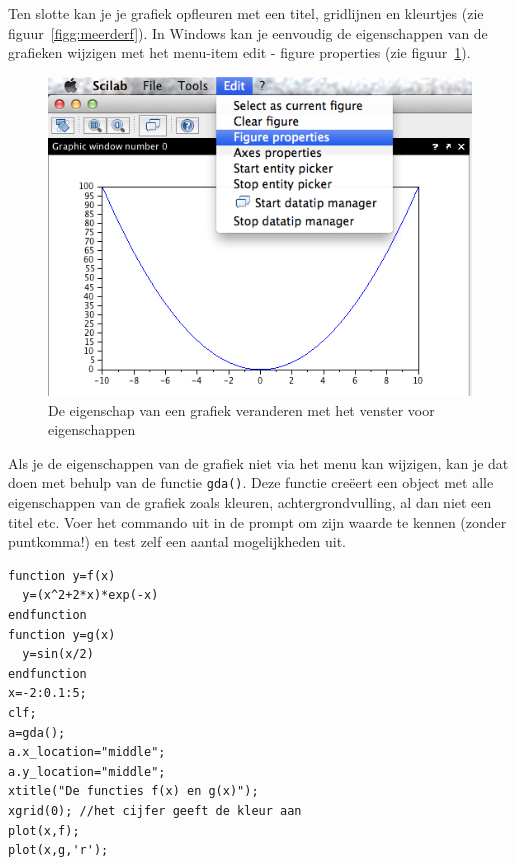 Ten slotte kan je je grafiek opfleuren met een titel, gridlijnen en kleurtjes (zie figuur~\ref{figg:meerderf}). In Windows kan je eenvoudig de eigenschappen van de grafieken wijzigen met het menu-item edit - figure properties (zie figuur~\ref{fig:11bgrafiek}). 
\begin{figure}[htbp]
\centering
\includegraphics[width=\textwidth]{figuren/scilab/11bgrafiek}
\caption{De eigenschap van een grafiek veranderen met het venster voor eigenschappen}
\label{fig:11bgrafiek}
\end{figure}

Als je de eigenschappen van de grafiek niet via het menu kan wijzigen, kan je dat doen met behulp van de functie \verb+gda()+. Deze functie creëert een object met alle eigenschappen van de grafiek zoals kleuren, achtergrondvulling, al dan niet een titel etc. Voer het commando uit in de prompt om zijn waarde te kennen (zonder puntkomma!) en test zelf een aantal mogelijkheden uit.


\begin{lstlisting}[caption={Meerdere functies in \'e\'en grafiek}, label=meerderefunctiesplotten]	
function y=f(x)
  y=(x^2+2*x)*exp(-x)
endfunction
function y=g(x)
  y=sin(x/2)
endfunction
x=-2:0.1:5;
clf;
a=gda(); 
a.x_location="middle";
a.y_location="middle";
xtitle("De functies f(x) en g(x)");
xgrid(0); //het cijfer geeft de kleur aan
plot(x,f);
plot(x,g,'r');
\end{lstlisting}

